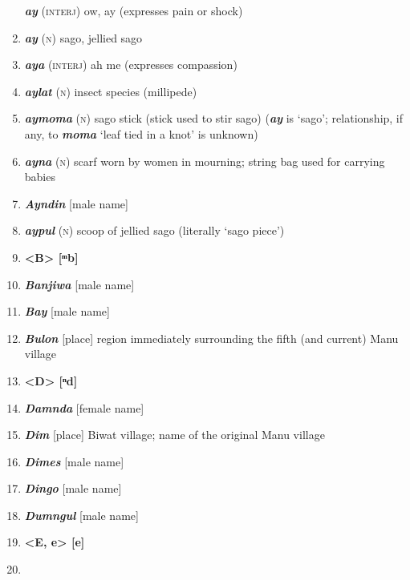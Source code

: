 \begin{enumerate}[noitemsep, label={}, align=left, widest=190, labelsep=1ex,leftmargin=*,itemindent=-10pt]
\textbf{\textit{ay}} (\textsc{interj}) ow, ay (expresses pain or shock) \item 
\textbf{\textit{ay}} (\textsc{n}) sago, jellied sago \item 
\textbf{\textit{aya}} (\textsc{interj}) ah me (expresses compassion) \item 
\textbf{\textit{aylat}} (\textsc{n}) insect species (millipede) \item 
\textbf{\textit{aymoma}} (\textsc{n}) sago stick (stick used to stir sago) (\textit{\textbf{ay}} is ‘sago’; relationship, if any, to \textbf{\textit{moma}} ‘leaf tied in a knot’ is unknown) \item 
\textbf{\textit{ayna}} (\textsc{n}) scarf worn by women in mourning; string bag used for carrying babies \item 
\textbf{\textit{Ayndin}} [male name] \item 
\textbf{\textit{aypul}} (\textsc{n}) scoop of jellied sago (literally ‘sago piece’)\\ \item

\noindent \textbf{<B>        [ᵐb]}\\ \item

\textbf{\textit{Banjiwa}} [male name] \item 
\textbf{\textit{Bay}} [male name] \item 
\textbf{\textit{Bulon}} [place] region immediately surrounding the fifth (and current) Manu \linebreak village\\ \item

\noindent \textbf{<D>        [ⁿd]}\\ \item

\textbf{\textit{Damnda}} [female name] \item 
\textbf{\textit{Dim}} [place] Biwat village; name of the original Manu village \item 
\textbf{\textit{Dimes}} [male name] \item 
\textbf{\textit{Dingo}} [male name] \item 
\textbf{\textit{Dumngul}} [male name]\\ \item

\noindent \textbf{<E, e>        [e]}\\ \item


\end{enumerate}

